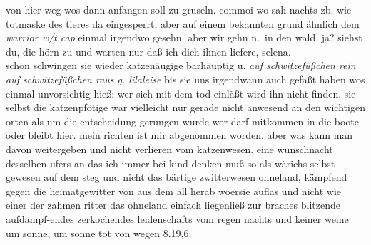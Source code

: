 \documentclass[
]{article}
\begin{document}
\begin{enumerate}
  von hier weg wos dann anfangen soll zu gruseln. commoi wo sah nachts
  zb. wie totmaske des tieres da eingesperrt, aber auf einem bekannten
  grund ähnlich dem \emph{warrior w/t cap} einmal irgendwo gesehn. aber
  wir gehn n.~in den wald, ja? siehst du, die hörn zu und warten nur daß
  ich dich ihnen liefere, selena.\\
  schon schwingen sie wieder katzenäugige barhäuptig u. \emph{auf
  schwitzefüßchen rein auf schwitzefüßchen raus g. lilaleise} bis sie
  uns irgendwann auch gefaßt haben wos einmal unvorsichtig hieß: wer
  sich mit dem tod einläßt wird ihn nicht finden. sie selbst die
  katzenpfötige war vielleicht nur gerade nicht anwesend an den
  wichtigen orten als um die entscheidung gerungen wurde wer darf
  mitkommen in die boote oder bleibt hier. mein richten ist mir
  abgenommen worden. aber was kann man davon weitergeben und nicht
  verlieren vom katzenwesen. eine wunschnacht desselben ufers an das ich
  immer bei kind denken muß so als wärichs selbst gewesen auf dem steg
  und nicht das bärtige zwitterwesen ohneland, kämpfend gegen die
  heimatgewitter von aus dem all herab woersie auflas und nicht wie
  einer der zahmen ritter das ohneland einfach liegenließ zur braches
  blitzende aufdampf-endes zerkochendes leidenschafts vom regen nachts
  und keiner weine um sonne, um sonne tot von wegen 8.19,6.
\end{enumerate}
\end{document}
